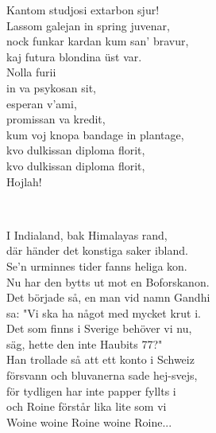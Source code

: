 \documentclass[a6paper, 10pt, twoside]{article}
\begin{document}
\begin{center}
\end{center}
\begin{lyrics}
\small Kantom studjosi extarbon sjur!\\
Lassom galejan in spring juvenar,\\
nock funkar kardan kum san' bravur,\\
kaj futura blondina üst var.\\
Nolla furii\\
in va psykosan sit,\\
esperan v'ami,\\
promissan va kredit,\\
kum voj knopa bandage in plantage,\\
kvo dulkissan diploma florit,\\
kvo dulkissan diploma florit,\\
Hojlah!
\end{lyrics}
\vspace{-16pt}\\
\begin{center}
\end{center}
\begin{lyrics}
\small I Indialand, bak Himalayas rand,\\
där händer det konstiga saker ibland.\\
Se'n urminnes tider fanns heliga kon.\\
Nu har den bytts ut mot en Boforskanon.
\vspace{5pt}\\
Det började så, en man vid namn Gandhi\\
sa: "Vi ska ha något med mycket krut i.\\
Det som finns i Sverige behöver vi nu,\\
säg, hette den inte Haubits 77?"
\vspace{5pt}\\
Han trollade så att ett konto i Schweiz\\
försvann och bluvanerna sade hej-svejs,\\
för tydligen har inte papper fyllts i\\
och Roine förstår lika lite som vi\\
Woine woine Roine woine Roine...
\end{lyrics}
\end{document}
